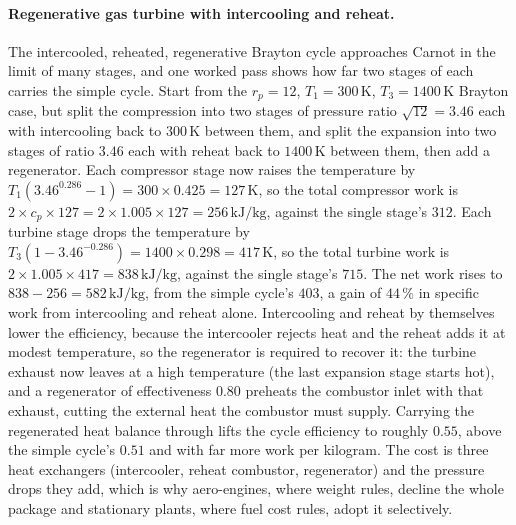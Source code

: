 \paragraph{Regenerative gas turbine with intercooling and reheat.} The
intercooled, reheated, regenerative Brayton cycle approaches Carnot in the
limit of many stages, and one worked pass shows how far two stages of each
carries the simple cycle. Start from the $r_p = 12$, $T_1 = 300\,\si{\kelvin}$,
$T_3 = 1400\,\si{\kelvin}$ Brayton case, but split the compression into two
stages of pressure ratio $\sqrt{12} = 3.46$ each with intercooling back to
$300\,\si{\kelvin}$ between them, and split the expansion into two stages of
ratio $3.46$ each with reheat back to $1400\,\si{\kelvin}$ between them, then
add a regenerator. Each compressor stage now raises the temperature by
$T_1(3.46^{0.286} - 1) = 300 \times 0.425 = 127\,\si{\kelvin}$, so the total
compressor work is $2 \times c_p \times 127 = 2 \times 1.005 \times 127 =
256\,\text{kJ}/\text{kg}$, against the single stage's $312$. Each turbine stage
drops the temperature by $T_3(1 - 3.46^{-0.286}) = 1400 \times 0.298 =
417\,\si{\kelvin}$, so the total turbine work is $2 \times 1.005 \times 417 =
838\,\text{kJ}/\text{kg}$, against the single stage's $715$. The net work rises
to $838 - 256 = 582\,\text{kJ}/\text{kg}$, from the simple cycle's $403$, a gain
of $44\,\%$ in specific work from intercooling and reheat alone. Intercooling
and reheat by themselves lower the efficiency, because the intercooler rejects
heat and the reheat adds it at modest temperature, so the regenerator is
required to recover it: the turbine exhaust now leaves at a high temperature
(the last expansion stage starts hot), and a regenerator of effectiveness
$0.80$ preheats the combustor inlet with that exhaust, cutting the external
heat the combustor must supply. Carrying the regenerated heat balance through
lifts the cycle efficiency to roughly $0.55$, above the simple cycle's $0.51$
and with far more work per kilogram. The cost is three heat exchangers
(intercooler, reheat combustor, regenerator) and the pressure drops they add,
which is why aero-engines, where weight rules, decline the whole package and
stationary plants, where fuel cost rules, adopt it selectively.

